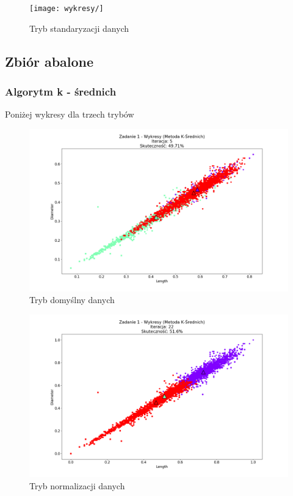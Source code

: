 \documentclass{classrep}
\begin{document}
{{{				\begin{figure}[!htbp]
					\texttt{[image: wykresy/]}
					\caption{Tryb standaryzacji danych}
				\end{figure}
			\FloatBarrier
		\fi
		}
	}
	\subsection{Zbiór abalone}
	{
		\subsubsection{Algorytm k - średnich}
		{
			Poniżej wykresy dla trzech trybów
				\begin{figure}[!htbp]
					\includegraphics[width=\textwidth]{wykresy/plot_k_meansAbaloneDefault.png}
					\caption{Tryb domyślny danych}
				\end{figure}
			
				\begin{figure}[!htbp]
					\includegraphics[width=\textwidth]{wykresy/plot_k_meansAbaloneNormalised.png}
					\caption{Tryb normalizacji danych}
				\end{figure}
		
}}}
\end{document}
